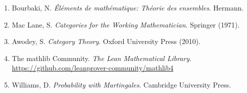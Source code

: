 \documentclass{ltjsarticle}
\theoremstyle{definition}
\begin{document}
\begin{enumerate}
  \item Bourbaki, N. \textit{Éléments de mathématique: Théorie des ensembles}. Hermann.
  \item Mac Lane, S. \textit{Categories for the Working Mathematician}. Springer (1971).
  \item Awodey, S. \textit{Category Theory}. Oxford University Press (2010).
  \item The mathlib Community. \textit{The Lean Mathematical Library}. 
    \url{https://github.com/leanprover-community/mathlib4}
  \item Williams, D. \textit{Probability with Martingales}. Cambridge University Press.
\end{enumerate}
\end{document}
